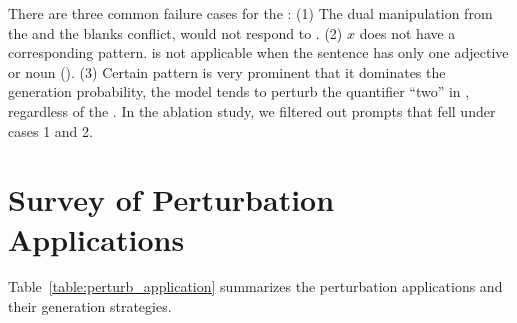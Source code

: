 There are three common failure cases for the \tagstrshorts:
(1) The dual manipulation from the \tagstrs and the blanks conflict, \eg {} would not respond to .
(2) $x$ does not have a corresponding pattern.  is not applicable when the sentence has only one adjective or noun (\eg {}).
(3) Certain pattern is very prominent that it dominates the generation probability, \eg the model tends to perturb the quantifier ``two'' in , regardless of the \tagstrshort.
In the ablation study, we filtered out prompts that fell under cases 1 and 2.







\section{Survey of Perturbation Applications}
\label{appendix:paper_survey}


Table~\ref{table:perturb_application} summarizes the perturbation applications and their generation strategies.
